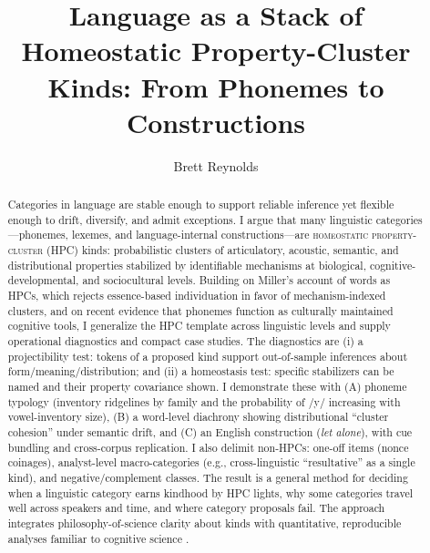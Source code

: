 \documentclass[12pt]{article}
\title{Language as a Stack of Homeostatic Property-Cluster Kinds: From Phonemes to Constructions}
\author{Brett Reynolds}
\date{}
\begin{document}
\maketitle

\begin{abstract}
\noindent Categories in language are stable enough to support reliable inference yet flexible enough to drift, diversify, and admit exceptions. I argue that many linguistic categories---phonemes, lexemes, and language-internal constructions---are \textsc{homeostatic property-cluster} (HPC) kinds: probabilistic clusters of articulatory, acoustic, semantic, and distributional properties stabilized by identifiable mechanisms at biological, cognitive-developmental, and sociocultural levels. Building on Miller's account of words as HPCs, which rejects essence-based individuation in favor of mechanism-indexed clusters, and on recent evidence that phonemes function as culturally maintained cognitive tools, I generalize the HPC template across linguistic levels and supply operational diagnostics and compact case studies. The diagnostics are (i) a projectibility test: tokens of a proposed kind support out-of-sample inferences about form/meaning/distribution; and (ii) a homeostasis test: specific stabilizers can be named and their property covariance shown. I demonstrate these with (A) phoneme typology (inventory ridgelines by family and the probability of /y/ increasing with vowel-inventory size), (B) a word-level diachrony showing distributional ``cluster cohesion'' under semantic drift, and (C) an English construction (\emph{let alone}), with cue bundling and cross-corpus replication. I also delimit non-HPCs: one-off items (nonce coinages), analyst-level macro-categories (e.g., cross-linguistic ``resultative'' as a single kind), and negative/complement classes. The result is a general method for deciding when a linguistic category earns kindhood by HPC lights, why some categories travel well across speakers and time, and where category proposals fail. The approach integrates philosophy-of-science clarity about kinds with quantitative, reproducible analyses familiar to cognitive science \citep{Miller2021WordsSpeciesKinds,Ekstrom2025PhonemeTool}.
\end{abstract}
\end{document}
